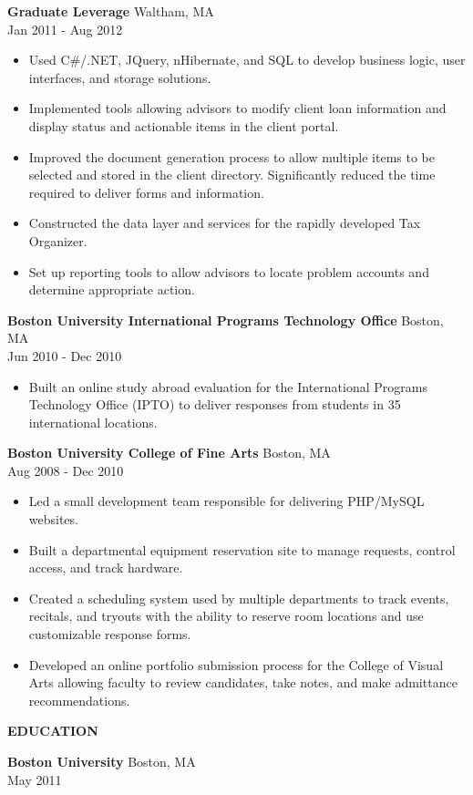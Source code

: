 \documentclass[10pt]{article}
\newcommand{\verticalspace}{\vspace{1.5mm}}
\newcommand{\horizontalrule}{\noindent\hrulefill}
\newcommand{\heading}{\noindent\Large\bf} %
\newcommand{\headingspace}{\vspace{5mm}}
\begin{document}
\verticalspace

{\bf Graduate Leverage} \hfill Waltham, MA \\
 \hfill Jan 2011 - Aug 2012
\begin{itemize}
\item Used C\#/.NET, JQuery, nHibernate, and SQL to develop business logic, user interfaces, and storage solutions.
\item Implemented tools allowing advisors to modify client loan information and display status and actionable items in the client portal.
\item Improved the document generation process to allow multiple items to be selected and stored in the client directory. Significantly reduced the time required to deliver forms and information.
\item Constructed the data layer and services for the rapidly developed Tax Organizer.
\item Set up reporting tools to allow advisors to locate problem accounts and determine appropriate action.
\end{itemize}

\verticalspace

{\bf Boston University International Programs Technology Office} \hfill Boston, MA \\
 \hfill Jun 2010 - Dec 2010
\begin{itemize}
\item Built an online study abroad evaluation for the International Programs Technology Office (IPTO) to deliver responses from students in 35 international locations.
\end{itemize}

\verticalspace

{\bf Boston University College of Fine Arts} \hfill Boston, MA \\
 \hfill Aug 2008 - Dec 2010
\begin{itemize}
\item Led a small development team responsible for delivering PHP/MySQL websites. 
\item Built a departmental equipment reservation site to manage requests, control access, and track hardware.
\item Created a scheduling system used by multiple departments to track events, recitals, and tryouts with the ability to reserve room locations and use customizable response forms.
\item Developed an online portfolio submission process for the College of Visual Arts allowing faculty to review candidates, take notes, and make admittance recommendations.
\end{itemize}

\headingspace
{\heading EDUCATION}

\verticalspace

{\bf Boston University} \hfill Boston, MA \\
 \hfill May 2011
\end{document}
